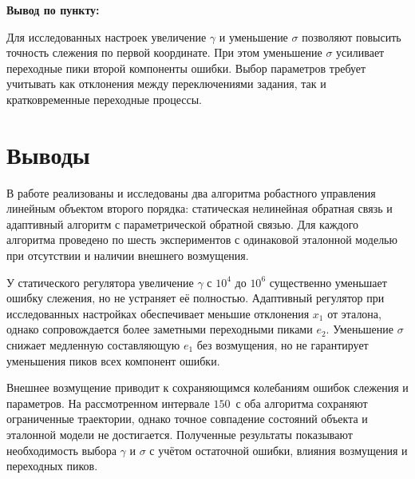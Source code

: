 \noindent\begin{minipage}{\linewidth}
\noindent\textbf{Вывод по пункту:}

Для исследованных настроек увеличение $\gamma$ и уменьшение $\sigma$
позволяют повысить точность слежения по первой координате.
При этом уменьшение $\sigma$ усиливает переходные пики второй компоненты
ошибки. Выбор параметров требует учитывать как отклонения между
переключениями задания, так и кратковременные переходные процессы.
\end{minipage}

\section{Выводы}

В работе реализованы и исследованы два алгоритма робастного управления
линейным объектом второго порядка: статическая нелинейная обратная связь
и адаптивный алгоритм с параметрической обратной связью.
Для каждого алгоритма проведено по шесть экспериментов с одинаковой
эталонной моделью при отсутствии и наличии внешнего возмущения.

У статического регулятора увеличение $\gamma$ с $10^4$ до $10^6$
существенно уменьшает ошибку слежения, но не устраняет её полностью.
Адаптивный регулятор при исследованных настройках обеспечивает меньшие
отклонения $x_1$ от эталона, однако сопровождается более заметными
переходными пиками $e_2$. Уменьшение $\sigma$ снижает медленную
составляющую $e_1$ без возмущения, но не гарантирует уменьшения пиков
всех компонент ошибки.

Внешнее возмущение приводит к сохраняющимся колебаниям ошибок слежения
и параметров. На рассмотренном интервале $150$~с оба алгоритма сохраняют
ограниченные траектории, однако точное совпадение состояний объекта
и эталонной модели не достигается. Полученные результаты показывают
необходимость выбора $\gamma$ и $\sigma$ с учётом остаточной ошибки,
влияния возмущения и переходных пиков.

